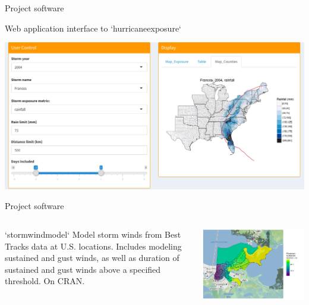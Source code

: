 \documentclass[ignorenonframetext,]{beamer}
\begin{document}
\begin{frame}{Project software}

\vspace{-0.2cm} \large

\begin{center}
Web application interface to `hurricaneexposure`
\end{center}

\vspace{-0.3cm}

\includegraphics[width=\textwidth]{figures/hurricane_exposure_website}

\end{frame}

\begin{frame}{Project software}

\begin{columns}
\begin{column}{0.3\textwidth}
\footnotesize
\begin{block}{`stormwindmodel`}
Model storm winds from Best Tracks data at U.S. locations. Includes modeling sustained and gust winds, as well as duration of sustained and gust winds above a specified threshold. On CRAN.
\end{block}
\end{column}
\begin{column}{0.7\textwidth}

\begin{center}\includegraphics[width=\textwidth]{figures/census_track_modeled_winds} \end{center}
\end{column}
\end{columns}

\end{frame}
\end{document}
